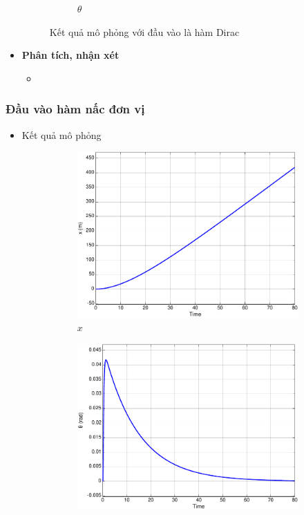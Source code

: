 \documentclass[12pt,a4paper]{article}
\begin{document}
\begin{itemize}
\begin{figure}[ht]
\begin{subfigure}[b]{0.495\linewidth}
            \caption{$\theta$}
        \end{subfigure}
        \caption{Kết quả mô phỏng với đầu vào là hàm Dirac}
    \end{figure}
    \item \textbf{Phân tích, nhận xét}
    \begin{itemize}
        \item 
    \end{itemize}
\end{itemize}


\subsubsection{Đầu vào hàm nấc đơn vị}
\begin{itemize}
    \item Kết quả mô phỏng 
    \begin{figure}[ht]
        \centering
        \begin{subfigure}[b]{0.495\linewidth}
            \centering
            \includegraphics[width=\linewidth]{phan_tich_x_step.pdf}
            \caption{$x$}
        \end{subfigure}\hfill
        \begin{subfigure}[b]{0.495\linewidth}
            \centering
            \includegraphics[width=\linewidth]{phan_tich_theta_step.pdf}

\end{subfigure}
\end{figure}
\end{itemize}
\end{document}
